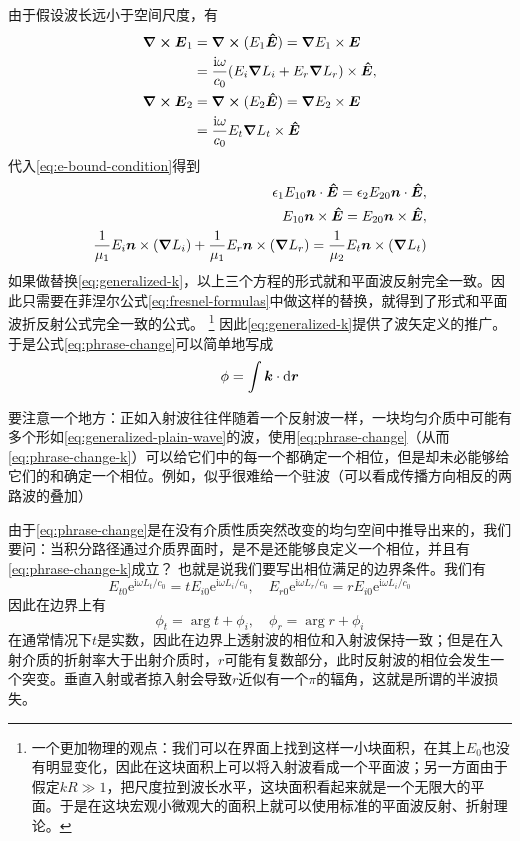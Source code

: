 \documentclass[UTF8, a4paper]{ctexart}
\newcommand*{\ii}{\mathrm{i}}
\newcommand*{\ee}{\mathrm{e}}
\begin{document}
由于假设波长远小于空间尺度，有
\[
    \begin{aligned}
        \curl{\vb*{E}_1} &= \curl{(E_1 \vu*{E})} = \grad{E_1} \times \vb*{E} \\
        &= \frac{\ii \omega}{c_0} (E_{i} \grad{L_i} + E_{r} \grad{L_r}) \times \vu*{E}, \\
        \curl{\vb*{E}_2} &= \curl{(E_2 \vu*{E})} = \grad{E_2} \times \vb*{E} \\
        &= \frac{\ii \omega}{c_0} E_{t} \grad{L_t} \times \vu*{E}
    \end{aligned}
\]
代入\eqref{eq:e-bound-condition}得到
\[
    \begin{aligned}
        \epsilon_1 E_{10} \vb*{n} \cdot \vu*{E} = \epsilon_2 E_{20} \vb*{n} \cdot \vu*{E}, \\
        E_{10} \vb*{n} \times \vu*{E} = E_{20} \vb*{n} \times \vu*{E}, \\
        \frac{1}{\mu_1} E_i \vb*{n} \times (\grad{L_i}) + \frac{1}{\mu_1} E_r \vb*{n} \times (\grad{L_r}) = \frac{1}{\mu_2} E_t \vb*{n} \times (\grad{L_t})
    \end{aligned}
\]
如果做替换\eqref{eq:generalized-k}，以上三个方程的形式就和平面波反射完全一致。因此只需要在菲涅尔公式\eqref{eq:fresnel-formulas}中做这样的替换，就得到了形式和平面波折反射公式完全一致的公式。%
\footnote{一个更加物理的观点：我们可以在界面上找到这样一小块面积，在其上$E_0$也没有明显变化，因此在这块面积上可以将入射波看成一个平面波；另一方面由于假定$kR \gg 1$，把尺度拉到波长水平，这块面积看起来就是一个无限大的平面。于是在这块宏观小微观大的面积上就可以使用标准的平面波反射、折射理论。}
因此\eqref{eq:generalized-k}提供了波矢定义的推广。
于是公式\eqref{eq:phrase-change}可以简单地写成
\begin{equation}
    \phi = \int \vb*{k} \cdot \dd{\vb*{r}}
    \label{eq:phrase-change-k}
\end{equation}

要注意一个地方：正如入射波往往伴随着一个反射波一样，一块均匀介质中可能有多个形如\eqref{eq:generalized-plain-wave}的波，使用\eqref{eq:phrase-change}（从而\eqref{eq:phrase-change-k}）可以给它们中的每一个都确定一个相位，但是却未必能够给它们的和确定一个相位。例如，似乎很难给一个驻波（可以看成传播方向相反的两路波的叠加）

由于\eqref{eq:phrase-change}是在没有介质性质突然改变的均匀空间中推导出来的，我们要问：当积分路径通过介质界面时，是不是还能够良定义一个相位，并且有\eqref{eq:phrase-change-k}成立？
也就是说我们要写出相位满足的边界条件。我们有
\[
    E_{t0} \ee^{\ii \omega L_t / c_0} = t E_{i0} \ee^{\ii \omega L_i / c_0}, \quad E_{r0} \ee^{\ii \omega L_r / c_0} = r E_{i0} \ee^{\ii \omega L_i / c_0}
\]
因此在边界上有
\begin{equation}
    \phi_t = \arg t + \phi_i, \quad \phi_r = \arg r + \phi_i
    \label{eq:phrase-on-surface}
\end{equation}
在通常情况下$t$是实数，因此在边界上透射波的相位和入射波保持一致；但是在入射介质的折射率大于出射介质时，$r$可能有复数部分，此时反射波的相位会发生一个突变。垂直入射或者掠入射会导致$r$近似有一个$\pi$的辐角，这就是所谓的半波损失。
\end{document}
